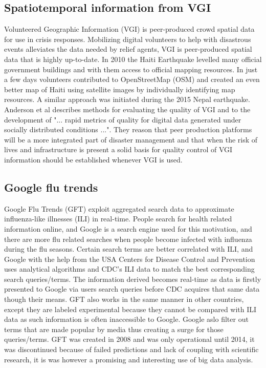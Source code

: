 \subsection{Spatiotemporal information from VGI}
Volunteered Geographic Information (VGI) is peer-produced crowd spatial data for use in crisis responses. Mobilizing digital volunteers to help with disastrous events alleviates the data needed by relief agents, VGI is peer-produced spatial data that is highly up-to-date. In 2010 the Haiti Earthquake levelled many official government buildings and with them access to official mapping resources\cite{palen2015success}. In just a few days volunteers contributed to OpenStreetMap\cite{OpenStreetMap} (OSM) and created an even better map of Haiti using satellite images by individually identifying map resources. A similar approach was initiated during the 2015 Nepal earthquake\cite{hu2016task}. Anderson et al\cite{anderson2018crowd} describes methods for evaluating the quality of VGI and to the development of "... rapid metrics of quality for digital data generated under socially distributed conditions ...". They reason that peer production platforms will be a more integrated part of disaster management and that when the risk of lives and infrastructure is present a solid basis for quality control of VGI information should be established whenever VGI is used.





\subsection{Google flu trends}
Google Flu Trends (GFT) exploit aggregated search data to approximate influenza-like illnesses (ILI) in real-time. People search for health related information online, and Google is a search engine used for this motivation, and there are more flu related searches when people become infected with influenza during the flu seasons. Certain search terms are better correlated with ILI, and Google with the help from the USA Centers for Disease Control and Prevention\cite{CDC} uses analytical algorithms and CDC's ILI data to match the best corresponding search queries/terms. The information derived becomes real-time as data is firstly presented to Google via users search queries before CDC acquires that same data though their means. GFT also works in the same manner in other countries, except they are labeled experimental because they cannot be compared with ILI data as such information is often inaccessible to Google. Google aslo filter out terms that are made popular by media thus creating a surge for those queries/terms. GFT was created in 2008 and was only operational until 2014, it was discontinued because of failed predictions and lack of coupling with scientific research, it is was however a promising and interesting use of big data analysis.


